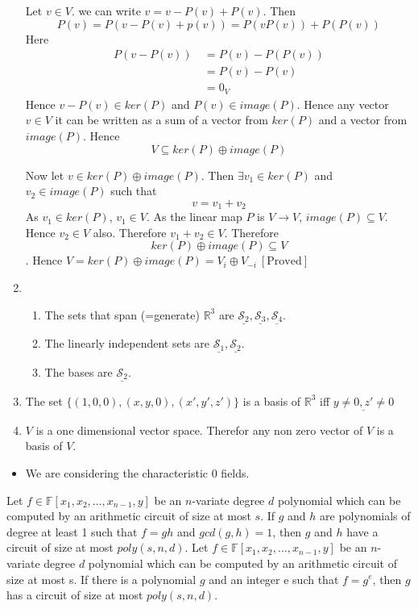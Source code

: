 \documentclass{article}
\newcommand{\mS}{\mathcal{S}}
\begin{document}
\begin{enumerate}
	      \hspace{1cm} Let $v\in V$. we can write $v=v-P(v)+P(v)$. Then $$P(v)=P(v-P(v)+p(v))=P(vP(v))+P(P(v))$$Here \begin{align*}
		      P(v-P(v))\  & =P(v)-P(P(v)) \\
		                  & =P(v)-P(v)    \\
		                  & =0_V
	      \end{align*}Hence $v-P(v)\in ker(P)$ and $P(v)\in image(P)$. Hence any vector $v\in V$ it can be written as a sum of a vector from $ker(P)$ and a vector from $image(P)$. Hence $$V\subseteq ker(P)\oplus image(P)$$

	      \hspace{1cm}Now let $v\in ker(P)\oplus image(P)$. Then $\exists v_1\in ker(P)$ and $v_2\in image(P)$ such that $$v=v_1+v_2$$As $v_1\in ker(P)$, $v_1\in V$. As the linear map $P$ is $V\to V$, $image(P)\subseteq V$. Hence $v_2\in V$ also. Therefore $v_1+v_2\in V$. Therefore$$ker(P)\oplus image(P)\subseteq V$$. Hence $V=ker(P)\oplus image(P)=V_i\oplus V_{-i}\ [\text{Proved}]$



	\item \begin{enumerate}
		      \item The sets that span (=generate) $\mathbb{R}^3$ are $\underline{\mS_2},\underline{\mS_3},\underline{\mS_4}$.
		      \item The linearly independent sets are $\underline{\mS_1},\underline{\mS_2}$.
		      \item The bases are $\underline{\mS_2}$.
	      \end{enumerate}
	\item The set $\{(1,0,0),(x,y,0),(x',y',z')\}$ is a basis of $\mathbb{R}^3$ iff $\underline{y\neq0, z'\neq 0}$
	\item $V$ is a one dimensional vector space. Therefor any non zero vector of $V$ is a basis of $V$.
\end{enumerate}
	\begin{itemize}
	\item We are considering the characteristic 0 fields.
\end{itemize}
	Let $f\in\mathbb{F}[x_1, x_2 ,\dots, x_{n-1}, y]$ be an $n$-variate degree $d$ polynomial which can be computed by an arithmetic circuit of size at most $s$. If $g$ and $h$ are polynomials of degree at least 1 such
	that $f = g  h$ and $gcd(g, h) = 1$, then $g$ and $h$ have a circuit of size at most $poly(s, n, d)$.
	Let $f \in \mathbb{F}\left[x_1, x_2, \ldots, x_{n-1}, y\right]$ be an $n$-variate degree $d$ polynomial which can be computed by an arithmetic circuit of size at most s. If there is a polynomial $g$ and an integer e such that $f=g^e$, then $g$ has a circuit of size at most ${poly}(s, n, d)$.
\end{document}
